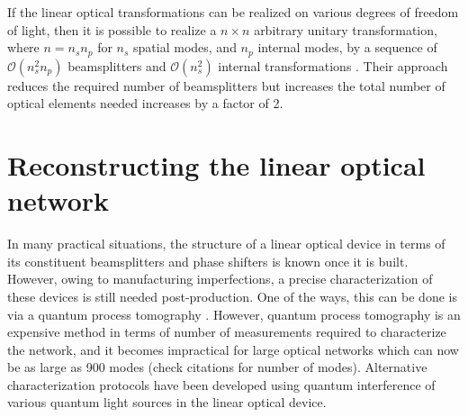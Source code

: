 \documentclass[aps,rmp,twocolumn,amsmath,amssymb,nofootinbib,superscriptaddress]{revtex4}
\begin{document}
If the linear optical transformations can be realized on various degrees of freedom of light, then it is possible to realize a $n\times n$ arbitrary unitary transformation, where $n=n_s n_p$ for $n_s$ spatial modes, and $n_p$ internal modes, by a sequence of $\mathcal{O}(n_s^2 n_p)$ beamsplitters and $\mathcal{O}(n_s^2)$ internal transformations \cite{bib:Dhand2015}. Their approach reduces the required number of beamsplitters but increases the total number of optical elements needed increases by a factor of 2.

\section{Reconstructing the linear optical network}

In many practical situations, the structure of a linear optical device in terms of its constituent beamsplitters and phase shifters is known once it is built. However, owing to manufacturing imperfections, a precise characterization of these devices is still needed post-production. One of the ways, this can be done is via a quantum process tomography \cite{bib:Mitchell03,bib:Obrien04,bib:Lobino08,bib:Saleh11} . However, quantum process tomography is an expensive method in terms of number of measurements required to characterize the network, and it becomes impractical for large optical networks which can now be as large as 900 modes (check citations for number of modes). Alternative characterization protocols have been developed using quantum interference of various quantum light sources \cite{bib:Laing12,bib:Rahimi-Keshari13} in the linear optical device.
\end{document}
